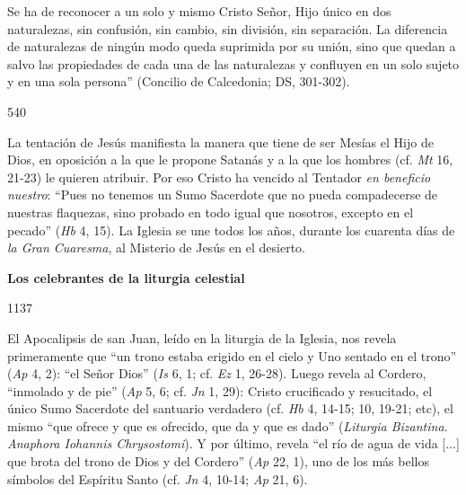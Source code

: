 			\begin{ccecite}Se ha de reconocer a un solo y mismo Cristo Señor, Hijo único en dos naturalezas, sin confusión, sin cambio, sin división, sin separación. La diferencia de naturalezas de ningún modo queda suprimida por su unión, sino que quedan a salvo las propiedades de cada una de las naturalezas y confluyen en un solo sujeto y en una sola persona” (Concilio de Calcedonia; DS, 301-302).\end{ccecite}
			
			\begin{ccebody}\begin{ccenumber}540\end{ccenumber} La tentación de Jesús manifiesta la manera que tiene de ser Mesías el Hijo de Dios, en oposición a la que le propone Satanás y a la que los hombres (cf. \textit{Mt} 16, 21-23) le quieren atribuir. Por eso Cristo ha vencido al Tentador \textit{en beneficio nuestro}: “Pues no tenemos un Sumo Sacerdote que no pueda compadecerse de nuestras flaquezas, sino probado en todo igual que nosotros, excepto en el pecado” (\textit{Hb} 4, 15). La Iglesia se une todos los años, durante los cuarenta días de \textit{la Gran Cuaresma}, al Misterio de Jesús en el desierto.\end{ccebody}
			
			\begin{ccebody}\textbf{Los celebrantes de la liturgia celestial}\end{ccebody}
			
			\begin{ccebody}\begin{ccenumber}1137\end{ccenumber} El Apocalipsis de san Juan, leído en la liturgia de la Iglesia, nos revela primeramente que “un trono estaba erigido en el cielo y Uno sentado en el trono” (\textit{Ap} 4, 2): “el Señor Dios” (\textit{Is }6, 1; cf. \textit{Ez} 1, 26-28). Luego revela al Cordero, “inmolado y de pie” (\textit{Ap} 5, 6; cf. \textit{Jn} 1, 29): Cristo crucificado y resucitado, el único Sumo Sacerdote del santuario verdadero (cf. \textit{Hb} 4, 14-15; 10, 19-21; etc), el mismo “que ofrece y que es ofrecido, que da y que es dado” (\textit{Liturgia Bizantina. Anaphora Iohannis Chrysostomi}). Y por último, revela “el río de agua de vida [...] que brota del trono de Dios y del Cordero” (\textit{Ap} 22, 1), uno de los más bellos símbolos del Espíritu Santo (cf. \textit{Jn} 4, 10-14; \textit{Ap} 21, 6).\end{ccebody}
			
